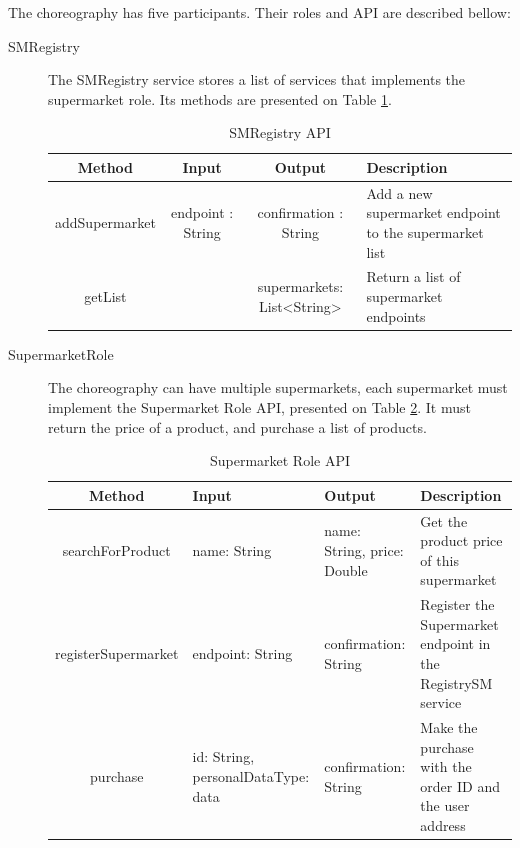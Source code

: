 The choreography has five participants. Their roles and API are described bellow:
\begin{description}
\item[SMRegistry] The SMRegistry service stores a list of services that implements the supermarket role. Its methods are presented on Table \ref{smregistryapi}.
	\begin{table}[htdp]
	\caption{SMRegistry API}
	\begin{center}
	\begin{tabular}{|c|c|c|m{4cm}|}
		\hline
		Method & Input & Output & Description \\ \hline
		addSupermarket & endpoint : String & confirmation : String & Add a new supermarket endpoint to the supermarket list \\ \hline
		getList & & supermarkets: List<String> & Return a list of supermarket endpoints \\ \hline
	\end{tabular}
	\end{center}
	\label{smregistryapi}
	\end{table}%

\item[SupermarketRole] The choreography can have multiple supermarkets, each supermarket must implement the Supermarket Role API, presented on Table \ref{smroleapi}. It must return the price of a product, and purchase a list of products.
	\begin{table}[htdp]
	\caption{Supermarket Role API}
	\begin{center}
	\begin{tabular}{|c|m{3.5cm}|m{3.5cm}|m{4cm}|}
		\hline
		Method				& Input						& Output 					& Description \\ \hline
		searchForProduct 		& name: String					& name: String, price: Double 	& Get the product price of this supermarket \\ \hline
		registerSupermarket		& endpoint: String				& confirmation: String		& Register the Supermarket endpoint in the RegistrySM service \\ \hline
		purchase				& id: String, personalDataType: data & confirmation: String		& Make the purchase with the order ID and the user address \\ \hline
	\end{tabular}
	\end{center}
	\label{smroleapi}
	\end{table}%
	

\end{description}
